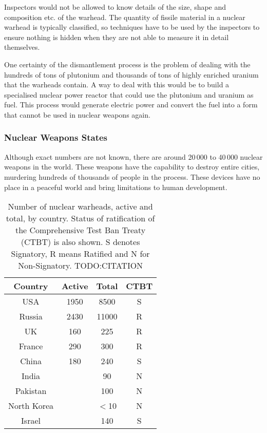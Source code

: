 \documentclass[twoside,titlepage,11pt,twocolumn,a4paper]{article}
\begin{document}
Inspectors would not be allowed to know details of the size, shape and
composition etc. of the warhead. The quantity of fissile material in a
nuclear warhead is typically classified, so techniques have to be used
by the inspectors to ensure nothing is hidden when they are not able
to measure it in detail themselves.

One certainty of the dismantlement process is the problem of dealing
with the hundreds of tons of plutonium and thousands of tons of highly
enriched uranium that the warheads contain. A way to deal with this
would be to build a specialised nuclear power reactor that could use
the plutonium and uranium as fuel. This process would generate
electric power and convert the fuel into a form that cannot be used in
nuclear weapons again. \citep{moxFuel, feiveson2011, nature2009}

\subsubsection{Nuclear Weapons States}
Although exact numbers are not known, there are around 20\,000 to
40\,000 nuclear weapons in the world. \citep{worldNuclearForces2011,
  norris2010} These weapons have the capability to destroy entire
cities, murdering hundreds of thousands of people in the
process. These devices have no place in a peaceful world and bring
limitations to human development.

\begin{table}
  \begin{tabular}{|c|c|c|c|}
    \hline
    Country	& Active& Total		& CTBT	\\
    \hline
    USA		& 1950 	& 8500		& S	\\
    Russia	& 2430 	& 11000		& R	\\
    UK		& 160 	& 225		& R	\\
    France	& 290	& 300		& R	\\
    China	& 180	& 240		& S	\\
    India	&	& 90		& N	\\
    Pakistan	&	& 100		& N	\\
    North Korea	&	& \(<\)10	& N	\\
    Israel	&	& 140		& S	\\
    \hline
  \end{tabular}
  \caption{Number of nuclear warheads, active and total, by
    country. Status of ratification of the Comprehensive Test Ban
    Treaty (CTBT) is also shown. S denotes Signatory, R means Ratified
    and N for Non-Signatory. TODO:CITATION}
\end{table}
\end{document}
